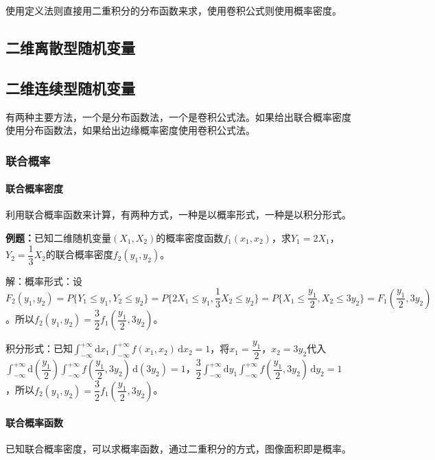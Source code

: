 \documentclass[UTF8, 12pt]{ctexart}
\begin{document}
使用定义法则直接用二重积分的分布函数来求，使用卷积公式则使用概率密度。

\subsection{二维离散型随机变量}

\subsection{二维连续型随机变量}

有两种主要方法，一个是分布函数法，一个是卷积公式法。如果给出联合概率密度使用分布函数法，如果给出边缘概率密度使用卷积公式法。

\subsubsection{联合概率}

\paragraph{联合概率密度} \leavevmode \medskip

利用联合概率函数来计算，有两种方式，一种是以概率形式，一种是以积分形式。

\textbf{例题：}已知二维随机变量$(X_1,X_2)$的概率密度函数$f_1(x_1,x_2)$，求$Y_1=2X_1$，$Y_2=\dfrac{1}{3}X_2$的联合概率密度$f_2(y_1,y_2)$。

解：概率形式：设$F_2(y_1,y_2)=P\{Y_1\leqslant y_1,Y_2\leqslant y_2\}=P\{2X_1\leqslant y_1,\dfrac{1}{3}X_2\leqslant y_2\}=P\{X_1\leqslant\dfrac{y_1}{2},X_2\leqslant3y_2\}=F_1(\dfrac{y_1}{2},3y_2)$。所以$f_2(y_1,y_2)=\dfrac{3}{2}f_1(\dfrac{y_1}{2},3y_2)$。

积分形式：已知$\int_{-\infty}^{+\infty}\textrm{d}x_1\int_{-\infty}^{+\infty}f(x_1,x_2)\,\textrm{d}x_2=1$，将$x_1=\dfrac{y_1}{2}$，$x_2=3y_2$代入$\int_{-\infty}^{+\infty}\textrm{d}(\dfrac{y_1}{2})\int_{-\infty}^{+\infty}f(\dfrac{y_1}{2},3y_2)\,\textrm{d}(3y_2)=1$，$\dfrac{3}{2}\int_{-\infty}^{+\infty}\textrm{d}y_1\int_{-\infty}^{+\infty}f(\dfrac{y_1}{2},3y_2)\,\textrm{d}y_2=1$，所以$f_2(y_1,y_2)=\dfrac{3}{2}f_1(\dfrac{y_1}{2},3y_2)$。

\paragraph{联合概率函数} \leavevmode \medskip

已知联合概率密度，可以求概率函数，通过二重积分的方式，图像面积即是概率。
\end{document}
